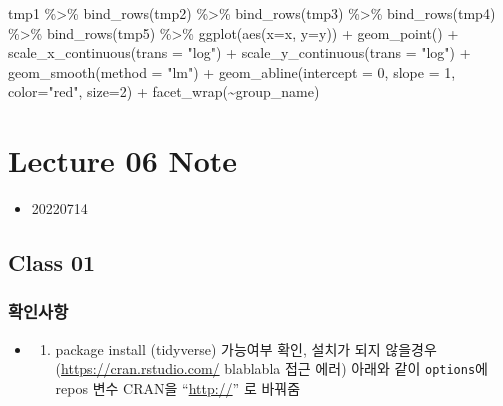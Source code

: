 \documentclass[
]{book}
\newenvironment{Shaded}{\begin{snugshade}}{\end{snugshade}}
\newcommand{\AttributeTok}[1]{\textcolor[rgb]{0.77,0.63,0.00}{#1}}
\newcommand{\DecValTok}[1]{\textcolor[rgb]{0.00,0.00,0.81}{#1}}
\newcommand{\FunctionTok}[1]{\textcolor[rgb]{0.00,0.00,0.00}{#1}}
\newcommand{\NormalTok}[1]{#1}
\newcommand{\SpecialCharTok}[1]{\textcolor[rgb]{0.00,0.00,0.00}{#1}}
\newcommand{\StringTok}[1]{\textcolor[rgb]{0.31,0.60,0.02}{#1}}
\providecommand{\tightlist}{%
  \setlength{\itemsep}{0pt}\setlength{\parskip}{0pt}}
\begin{document}
\begin{Shaded}
\begin{Highlighting}[]
\NormalTok{tmp1 }\SpecialCharTok{\%\textgreater{}\%} 
  \FunctionTok{bind\_rows}\NormalTok{(tmp2) }\SpecialCharTok{\%\textgreater{}\%} 
  \FunctionTok{bind\_rows}\NormalTok{(tmp3) }\SpecialCharTok{\%\textgreater{}\%} 
  \FunctionTok{bind\_rows}\NormalTok{(tmp4) }\SpecialCharTok{\%\textgreater{}\%} 
  \FunctionTok{bind\_rows}\NormalTok{(tmp5) }\SpecialCharTok{\%\textgreater{}\%} 
  \FunctionTok{ggplot}\NormalTok{(}\FunctionTok{aes}\NormalTok{(}\AttributeTok{x=}\NormalTok{x, }\AttributeTok{y=}\NormalTok{y)) }\SpecialCharTok{+}
    \FunctionTok{geom\_point}\NormalTok{() }\SpecialCharTok{+}
    \FunctionTok{scale\_x\_continuous}\NormalTok{(}\AttributeTok{trans =} \StringTok{"log"}\NormalTok{) }\SpecialCharTok{+}
    \FunctionTok{scale\_y\_continuous}\NormalTok{(}\AttributeTok{trans =} \StringTok{"log"}\NormalTok{) }\SpecialCharTok{+}
    \FunctionTok{geom\_smooth}\NormalTok{(}\AttributeTok{method =} \StringTok{"lm"}\NormalTok{) }\SpecialCharTok{+}
    \FunctionTok{geom\_abline}\NormalTok{(}\AttributeTok{intercept =} \DecValTok{0}\NormalTok{, }\AttributeTok{slope =} \DecValTok{1}\NormalTok{, }\AttributeTok{color=}\StringTok{"red"}\NormalTok{, }\AttributeTok{size=}\DecValTok{2}\NormalTok{) }\SpecialCharTok{+}
    \FunctionTok{facet\_wrap}\NormalTok{(}\SpecialCharTok{\textasciitilde{}}\NormalTok{group\_name)}
\end{Highlighting}
\end{Shaded}

\hypertarget{lecture-06-note}{%
\chapter{Lecture 06 Note}\label{lecture-06-note}}

\begin{itemize}
\tightlist
\item
  20220714
\end{itemize}

\hypertarget{class-01-1}{%
\section{Class 01}\label{class-01-1}}

\hypertarget{uxd655uxc778uxc0acuxd56d}{%
\subsection{확인사항}\label{uxd655uxc778uxc0acuxd56d}}

\begin{itemize}
\item
  \begin{enumerate}
  \def\labelenumi{\arabic{enumi})}
  \tightlist
  \item
    package install (tidyverse) 가능여부 확인, 설치가 되지 않을경우 (\url{https://cran.rstudio.com/} blablabla 접근 에러) 아래와 같이 \texttt{options}에 repos 변수 CRAN을 ``\url{http://}'' 로 바꿔줌
  \end{enumerate}
\end{itemize}
\end{document}
